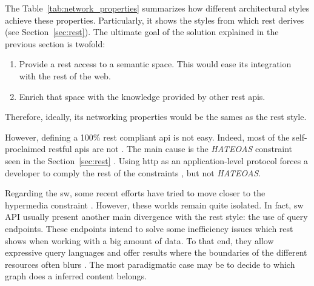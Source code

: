 
The Table~\ref{tab:network_properties} summarizes how different architectural styles achieve these properties.
Particularly, it shows the styles from which \ac{rest} derives (see Section~\ref{sec:rest}).
The ultimate goal of the solution explained in the previous section is twofold:
\begin{enumerate}
  \item Provide a \ac{rest} access to a semantic space.
       This would ease its integration with the rest of the web.
  \item Enrich that space with the knowledge provided by other \ac{rest} \acp{api}.
\end{enumerate}
Therefore, ideally, its networking properties would be the sames as the \ac{rest} style.


However, defining a 100\% \ac{rest} compliant \ac{api} is not easy.
Indeed, most of the self-proclaimed \ac{rest}ful \acp{api} are not \citep{house_how_2012}. %
The main cause is the \emph{HATEOAS} constraint seen in the Section~\ref{sec:rest} \citep{fielding_rest_2008}.
Using \ac{http} as an application-level protocol forces a developer to comply the rest of the constraints \citet{moore_hypermedia_2010}, but not \emph{HATEOAS}.


Regarding the \ac{sw}, some recent efforts have tried to move closer to the \ac{hypermedia} constraint \citep{steiner_fulfilling_2011,kjernsmo_necessity_2012}.
However, these worlds remain quite isolated.
In fact, \ac{sw} API  usually present another main divergence with the \ac{rest} style: the use of query endpoints.
These endpoints intend to solve some inefficiency issues which \ac{rest} shows when working with a big amount of data. %
To that end, they allow expressive query languages and offer results where the boundaries of the different resources often blurs \citep{wilde_restful_2009}.
The most paradigmatic case may be to decide to which graph does a inferred content belongs. %


